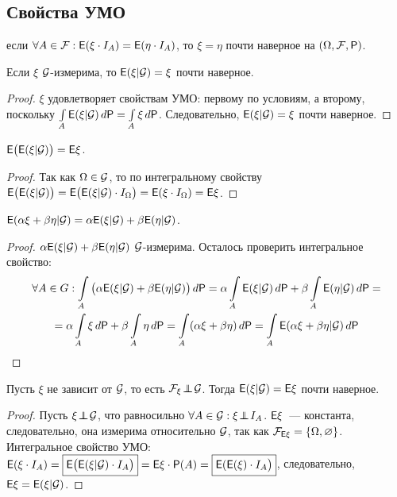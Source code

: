 \subsection{Свойства УМО}
\setcounter{property}{0}
 если $\forall A \in \mathcal{F}: \mathsf{E}(\xi \cdot I_A) = \mathsf{E}(\eta \cdot I_A)$, то $\xi = \eta$ почти наверное на $(\Omega, \mathcal{F}, \mathsf{P})$.
\begin{property}
	Если $\xi$ $\mathcal{G}$-измерима, то $\mathsf{E}(\xi | \mathcal{G}) = \xi$ почти наверное. 
	\begin{proof}
		$\xi$ удовлетворяет свойствам УМО: первому по условиям, а второму, поскольку $\int\limits_A \mathsf{E}(\xi|\mathcal{G}) \, d\mathsf{P} = \int\limits_A \xi \, d\mathsf{P}$. Следовательно, $\mathsf{E}(\xi | \mathcal{G}) = \xi$ почти наверное.  
	\end{proof}
\end{property}
\begin{property}
	 $\mathsf{E} \big( \mathsf{E}( \xi | \mathcal{G}) \big) = \mathsf{E}\xi$.
	 \begin{proof}
	 	Так как $\Omega \in \mathcal{G}$, то по интегральному свойству $\mathsf{E} \big( \mathsf{E}(\xi | \mathcal{G}) \big) = \mathsf{E} \big( \mathsf{E}(\xi | \mathcal{G} ) \cdot I_\Omega \big) = \mathsf{E}( \xi \cdot I_\Omega) = \mathsf{E}\xi$.
	 \end{proof}
\end{property}
\begin{property}[линейность]
	$\mathsf{E} (\alpha \xi + \beta \eta | \mathcal{G} ) = \alpha \mathsf{E}( \xi | \mathcal{G}) + \beta \mathsf{E}(\eta |\mathcal{G})$.
	\begin{proof}
		$\alpha \mathsf{E}(\xi | \mathcal{G}) + \beta \mathsf{E}(\eta | \mathcal{G})$ $\mathcal{G}$-измерима. Осталось проверить интегральное свойство:
		\begin{multline*}
			\forall A \in G: \int\limits_A \big( \alpha \mathsf{E}( \xi | \mathcal{G}) + \beta \mathsf{E}( \eta | \mathcal{G}) \big) \, d \mathsf{P} = \alpha \int\limits_A \mathsf{E}( \xi | \mathcal{G}) \, d \mathsf{P} + \beta \int\limits_A \mathsf{E}( \eta | \mathcal{G} ) \, d \mathsf{P} = \\ 
			= \alpha \int\limits_A \xi \, d \mathsf{P} + \beta \int\limits_A \eta \, d \mathsf{P} = \int\limits_A (\alpha \xi + \beta \eta ) \, d\mathsf{P} = \int\limits_A \mathsf{E}( \alpha\xi + \beta\eta|\mathcal{G}) \, d \mathsf{P}
		\end{multline*}
	\end{proof}
\end{property}
\begin{property}
	Пусть $\xi$ не зависит от $\mathcal{G}$, то есть $\mathcal{F}_\xi \!\perp\!\!\!\!\perp\! \mathcal{G}$. Тогда $\mathsf{E} ( \xi | \mathcal{G}) = \mathsf{E} \xi$ почти наверное.
	\begin{proof}
		Пусть $\xi \!\perp\!\!\!\!\perp\! \mathcal{G}$, что равносильно $\forall A \in \mathcal{G}: \xi \!\perp\!\!\!\!\perp\! I_A$. $\mathsf{E} \xi$~--- константа, следовательно, она измерима относительно $\mathcal{G}$, так как $\mathcal{F}_{\mathsf{E} \xi} = \{ \Omega, \varnothing \}$. Интегральное свойство УМО: $\mathsf{E} ( \xi \cdot I_A) = \boxed{\mathsf{E} \big( \mathsf{E}( \xi | \mathcal{G}) \cdot I_A \big)} = \mathsf{E} \xi \cdot \mathsf{P}(A) = \boxed{\mathsf{E}(\mathsf{E}(\xi) \cdot I_A \big)}$, следовательно, $\mathsf{E} \xi = \mathsf{E}( \xi | \mathcal{G})$.
	\end{proof}
\end{property}
